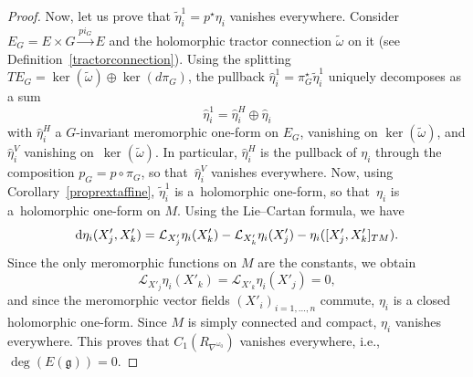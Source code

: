 \documentclass[10pt,a4paper]{amsart}
\numberwithin{equation}{section}
\begin{document}
\begin{proof}
Now, let us prove that $\tilde{\eta}^1_i = p^\star \eta_i$ vanishes everywhere. Consider $E_G=E\times G \overset{pi_G}{\longrightarrow}E$ and the holomorphic tractor connection $\tilde{\omega}$ on it (see Definition~\ref{tractorconnection}). Using the splitting $TE_G = \ker(\tilde{\omega}) \oplus \ker(d\pi_G)$, the pullback $\hat{\eta}^1_i= \pi_G^\star \tilde{\eta}^1_i$ uniquely decomposes as a sum
\[\hat{\eta}^1_i = \hat{\eta}_i^H \oplus \hat{\eta}_i \]
 with $\hat{\eta}_i^H$ a $G$-invariant meromorphic one-form on $E_G$, vanishing on $\ker(\tilde{\omega})$, and $\hat{\eta}^V_i$ vanishing on~$\ker(\tilde{\omega})$. In particular, $\hat{\eta}^H_i$ is the pullback of $\eta_i$ through the composition $p_G=p\circ \pi_G$, so that~$\hat{\eta}^V_i$ vanishes everywhere. Now, using Corollary~\ref{proprextaffine}, $\tilde{\eta}^1_i$ is a~holomorphic one-form, so that~$\eta_i$ is a~holomorphic one-form on $M$. Using the Lie--Cartan formula, we have
\[ {\rm d}\eta_i(X'_j,X'_k)=\mathcal{L}_{X'_j}\eta_i(X'_k) - \mathcal{L}_{X'_k}\eta_i(X'_j) - \eta_i([X'_j,X'_k]_{TM}). \]
 Since the only meromorphic functions on $M$ are the constants, we obtain \[\mathcal{L}_{X'_j}\eta_i(X'_k) =\mathcal{L}_{X'_k}\eta_i(X'_j) =0,\] and since the meromorphic vector fields $(X'_i)_{i=1,\dots,n}$ commute, $\eta_i$ is a closed holomorphic one-form. Since $M$ is simply connected and compact, $\eta_i$ vanishes everywhere. This proves that $C_1(R_{\nabla^{\omega_0}})$ vanishes everywhere, i.e., $\deg (E(\mathfrak{g}))=0$.


\end{proof}
\end{document}
